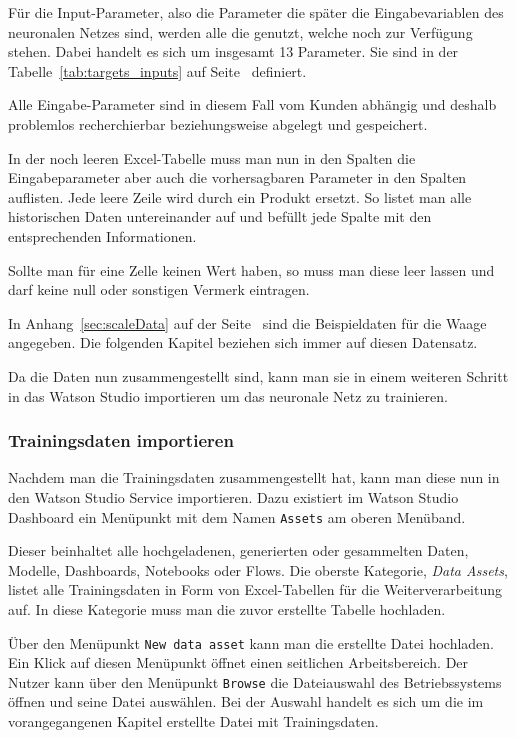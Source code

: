 Für die Input-Parameter, also die Parameter die später die Eingabevariablen des neuronalen Netzes sind, werden alle die
genutzt, welche noch zur Verfügung stehen. Dabei handelt es sich um insgesamt 13 Parameter. Sie sind in der
Tabelle~\ref{tab:targets_inputs} auf Seite~\pageref{tab:targets_inputs} definiert.

Alle Eingabe-Parameter sind in diesem Fall vom Kunden abhängig und deshalb problemlos recherchierbar beziehungsweise
abgelegt und gespeichert.

In der noch leeren Excel-Tabelle muss man nun in den Spalten die Eingabeparameter aber auch die vorhersagbaren Parameter
in den Spalten auflisten. Jede leere Zeile wird durch ein Produkt ersetzt. So listet man alle historischen Daten
untereinander auf und befüllt jede Spalte mit den entsprechenden Informationen.

Sollte man für eine Zelle keinen Wert haben, so muss man diese leer lassen und darf keine null oder sonstigen Vermerk
eintragen.

In Anhang~\ref{sec:scaleData} auf der Seite~\pageref{sec:scaleData} sind die Beispieldaten für die Waage angegeben. Die
folgenden Kapitel beziehen sich immer auf diesen Datensatz.

Da die Daten nun zusammengestellt sind, kann man sie in einem weiteren Schritt in das Watson Studio importieren um das
neuronale Netz zu trainieren.

\subsubsection{Trainingsdaten importieren}
Nachdem man die Trainingsdaten zusammengestellt hat, kann man diese nun in den Watson Studio Service importieren. Dazu
existiert im Watson Studio Dashboard ein Menüpunkt mit dem Namen \texttt{Assets} am oberen Menüband.

Dieser beinhaltet alle hochgeladenen, generierten oder gesammelten Daten, Modelle, Dashboards, Notebooks oder Flows. Die
oberste Kategorie, \textit{Data Assets}, listet alle Trainingsdaten in Form von Excel-Tabellen für die
Weiterverarbeitung auf. In diese Kategorie muss man die zuvor erstellte Tabelle hochladen.

Über den Menüpunkt \texttt{New data asset} kann man die erstellte Datei hochladen. Ein Klick auf diesen Menüpunkt öffnet
einen seitlichen Arbeitsbereich. Der Nutzer kann über den Menüpunkt \texttt{Browse} die Dateiauswahl des Betriebssystems
öffnen und seine Datei auswählen. Bei der Auswahl handelt es sich um die im vorangegangenen Kapitel erstellte Datei mit
Trainingsdaten.

